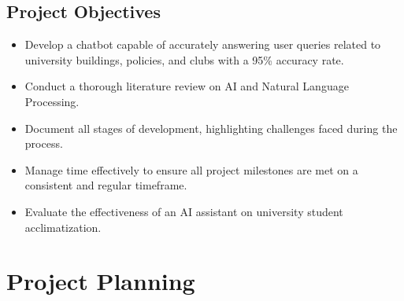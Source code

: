 \documentclass[12pt]{report}
\begin{document}
    \section{Project Objectives}
    \begin{itemize}
        \item Develop a chatbot capable of accurately answering user queries related to university 
        buildings, policies, and clubs with a 95\% accuracy rate.
        \item Conduct a thorough literature review on AI and Natural Language Processing.
        \item Document all stages of development, highlighting challenges faced during the process.
        \item Manage time effectively to ensure all project milestones are met on a consistent and regular timeframe.
        \item Evaluate the effectiveness of an AI assistant on university student acclimatization.
    \end{itemize}


    \chapter{Project Planning}
\end{document}
